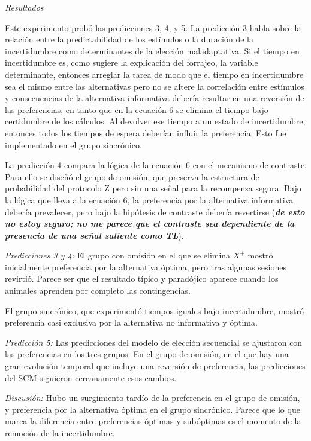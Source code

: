 \documentclass[a4paper,12pt]{article}
\begin{document}
{\itshape Resultados}

Este experimento probó las predicciones 3, 4, y 5. La predicción 3 habla sobre la relación entre la predictabilidad de los estímulos o la duración de la incertidumbre como determinantes de la elección maladaptativa. Si el tiempo en incertidumbre es, como sugiere la explicación del forrajeo, la variable determinante, entonces arreglar la tarea de modo que el tiempo en incertidumbre sea el mismo entre las alternativas pero no se altere la correlación entre estímulos y consecuencias de la alternativa informativa debería resultar en una reversión de las preferencias, en tanto que en la ecuación 6 se elimina el tiempo bajo certidumbre de los cálculos. Al devolver ese tiempo a un estado de incertidumbre, entonces todos los tiempos de espera deberían influir la preferencia. Esto fue implementado en el grupo sincrónico.

La predicción 4 compara la lógica de la ecuación 6 con el mecanismo de contraste. Para ello se diseñó el grupo de omisión, que preserva la estructura de probabilidad del protocolo Z pero sin una señal para la recompensa segura. Bajo la lógica que lleva a la ecuación 6, la preferencia por la alternativa informativa debería prevalecer, pero bajo la hipótesis de contraste debería revertirse ({\itshape\bfseries de esto no estoy seguro; no me parece que el contraste sea dependiente de la presencia de una señal saliente como TL}).

{\itshape Predicciones 3 y 4:} El grupo con omisión en el que se elimina $X^+$ mostró inicialmente preferencia por la alternativa óptima, pero tras algunas sesiones revirtió. Parece ser que el resultado típico y paradójico aparece cuando los animales aprenden por completo las contingencias.

El grupo sincrónico, que experimentó tiempos iguales bajo incertidumbre, mostró preferencia casi exclusiva por la alternativa no informativa y óptima.

{\itshape Predicción 5:} Las predicciones del modelo de elección secuencial se ajustaron con las preferencias en los tres grupos. En el grupo de omisión, en el que hay una gran evolución temporal que incluye una reversión de preferencia, las predicciones del SCM siguieron cercanamente esos cambios.

{\itshape Discusión:} Hubo un surgimiento tardío de la preferencia en el grupo de omisión, y preferencia por la alternativa óptima en el grupo sincrónico. Parece que lo que marca la diferencia entre preferencias óptimas y subóptimas es el momento de la remoción de la incertidumbre.
\end{document}
